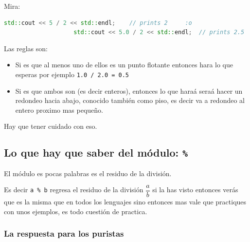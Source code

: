 \documentclass[12pt, fleqn]{report}                             %
\newcommand \Quote              {\qq}                           %
\theoremstyle{break}                                            %
\newcommand{\textCode}[1]  { \texttt{#1} }                      %
\begin{document}
                Mira:
                \begin{lstlisting}[language=C++, gobble=20]
                    std::cout << 5 / 2 << std::endl;    // prints 2     :o
                    std::cout << 5.0 / 2 << std::endl;  // prints 2.5   :o
                \end{lstlisting}


                Las reglas son:
                \begin{itemize}
                    \item  
                        Si es que al menos uno de ellos es un punto flotante entonces hara lo que esperas
                        por ejemplo \textCode{1.0 / 2.0 = 0.5}
                    \item  
                        Si es que ambos son \Quote{integrals} (es decir enteros), entonces lo que haraá seraá hacer un
                        redondeo hacia abajo, conocido también como piso, es decir
                        va a redondeo al entero proximo mas pequeño.
                \end{itemize}

                Hay que tener cuidado con eso.

            \subsection{Lo que hay que saber del módulo: \textCode{\%}}
            
                El módulo es pocas palabras es el residuo de la división.

                Es decir \textCode{a \% b} regresa el residuo de la división $\dfrac{a}{b}$
                si la has visto entonces verás que es la misma que en todos los lenguajes
                sino entonces mas vale que practiques con unos ejemplos, es todo cuestión
                de practica.

                \subsubsection{La respuesta para los puristas}
\end{document}
